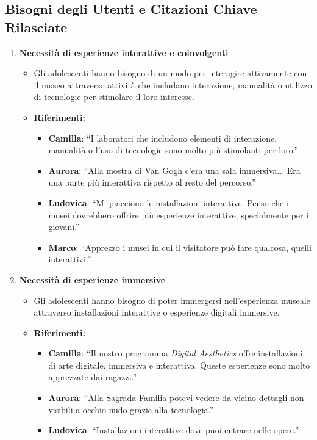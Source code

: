 \documentclass{article}
\begin{document}
\subsection{Bisogni degli Utenti e Citazioni Chiave Rilasciate}
\begin{enumerate}
    \item \textbf{Necessità di esperienze interattive e coinvolgenti}
    \begin{itemize}
        \item Gli adolescenti hanno bisogno di un modo per interagire attivamente con il museo attraverso attività che includano interazione, manualità o utilizzo di tecnologie per stimolare il loro interesse.
        \item \textbf{Riferimenti:}
        \begin{itemize}
            \item \textbf{Camilla}: ``I laboratori che includono elementi di interazione, manualità o l'uso di tecnologie sono molto più stimolanti per loro.''
            \item \textbf{Aurora}: ``Alla mostra di Van Gogh c'era una sala immersiva... Era una parte più interattiva rispetto al resto del percorso.''
            \item \textbf{Ludovica}: ``Mi piacciono le installazioni interattive. Penso che i musei dovrebbero offrire più esperienze interattive, specialmente per i giovani.''
            \item \textbf{Marco}: ``Apprezzo i musei in cui il visitatore può fare qualcosa, quelli interattivi.''
        \end{itemize}
    \end{itemize}

    \item \textbf{Necessità di esperienze immersive}
    \begin{itemize}
        \item Gli adolescenti hanno bisogno di poter immergersi nell'esperienza museale attraverso installazioni interattive o esperienze digitali immersive.
        \item \textbf{Riferimenti:}
        \begin{itemize}
            \item \textbf{Camilla}: ``Il nostro programma \emph{Digital Aesthetics} offre installazioni di arte digitale, immersiva e interattiva. Queste esperienze sono molto apprezzate dai ragazzi.''
            \item \textbf{Aurora}: ``Alla Sagrada Familia potevi vedere da vicino dettagli non visibili a occhio nudo grazie alla tecnologia.''
            \item \textbf{Ludovica}: ``Installazioni interattive dove puoi entrare nelle opere.''
        \end{itemize}
    \end{itemize}


\end{enumerate}
\end{document}

